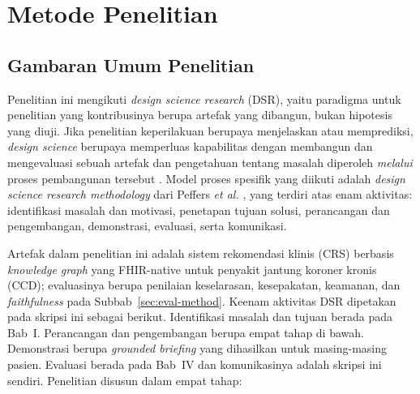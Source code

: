 \chapter{Metode Penelitian}


\section{Gambaran Umum Penelitian}

Penelitian ini mengikuti \emph{design science research} (DSR), yaitu paradigma untuk
penelitian yang kontribusinya berupa artefak yang dibangun, bukan hipotesis yang diuji. Jika
penelitian keperilakuan berupaya menjelaskan atau memprediksi, \emph{design science} berupaya
memperluas kapabilitas dengan membangun dan mengevaluasi sebuah artefak dan pengetahuan
tentang masalah diperoleh \emph{melalui} proses pembangunan tersebut \cite{hevner2004}. Model
proses spesifik yang diikuti adalah \emph{design science research methodology} dari Peffers
\textit{et al.} \cite{peffers2007}, yang terdiri atas enam aktivitas: identifikasi masalah dan
motivasi, penetapan tujuan solusi, perancangan dan pengembangan, demonstrasi, evaluasi, serta
komunikasi.

Artefak dalam penelitian ini adalah sistem rekomendasi klinis (CRS) berbasis
\emph{knowledge graph} yang FHIR-native untuk penyakit jantung koroner kronis (CCD);
evaluasinya berupa penilaian keselarasan, kesepakatan, keamanan, dan \emph{faithfulness}
pada Subbab~\ref{sec:eval-method}. Keenam aktivitas DSR dipetakan pada skripsi ini sebagai berikut. Identifikasi masalah dan
tujuan berada pada Bab~I. Perancangan dan pengembangan berupa empat tahap di bawah.
Demonstrasi berupa \emph{grounded briefing} yang dihasilkan untuk masing-masing pasien.
Evaluasi berada pada Bab~IV dan komunikasinya adalah skripsi ini sendiri. Penelitian disusun dalam
empat tahap:

